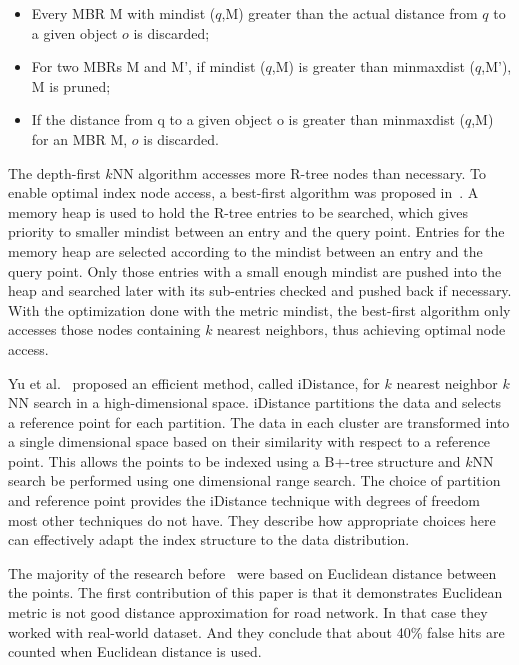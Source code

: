 \begin{itemize}
\item  Every MBR M with mindist ($q$,M) greater than the actual distance from $q$ to a given object $o$ is discarded;
\item For two MBRs M and M', if mindist ($q$,M) is greater than minmaxdist ($q$,M'), M is pruned;
\item  If the distance from q to a given object o is greater than minmaxdist ($q$,M) for an MBR M, $o$ is discarded.
\end{itemize}

The depth-first $k$NN algorithm accesses more R-tree nodes than necessary. To enable optimal index node access, a best-first algorithm was proposed in~\cite{NN2,NN3}. A memory heap is used to hold the R-tree entries to be searched, which gives priority
to smaller mindist between an entry and the query point. Entries for the memory heap are selected according to the mindist between an entry and the query point. Only those entries with a small enough mindist are pushed into the heap and searched later with its sub-entries checked and pushed back if necessary. With the optimization done with the metric mindist, the best-first algorithm only accesses those nodes containing $k$ nearest neighbors, thus achieving optimal node access.

Yu et al.~\cite{NN5} proposed an efficient method, called iDistance, for $k$ nearest neighbor $k$NN search in a high-dimensional space. iDistance partitions the data and selects a reference point for each partition. The data in each cluster are transformed into a single dimensional space based on their similarity with respect to a reference point. This allows the points to be indexed using a B+-tree structure and $k$NN search be performed using one dimensional range search. The choice of partition and reference point provides the iDistance technique with degrees of freedom most other techniques do not have. They describe how appropriate choices here can effectively adapt the index structure to the data distribution.

The majority of the research before~\cite{NN6} were based on Euclidean distance between the points. The first contribution of this paper is that it demonstrates Euclidean metric is not good distance approximation for road network. In that case they worked with real-world dataset. And they conclude that about 40\% false hits are counted when Euclidean distance is used.

